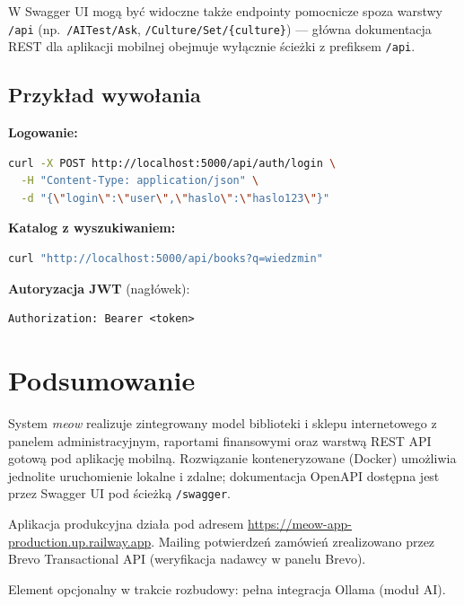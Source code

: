 \documentclass[12pt,a4paper]{article}
\begin{document}
W Swagger UI mogą być widoczne także endpointy pomocnicze spoza warstwy \texttt{/api}
(np.\ \texttt{/AITest/Ask}, \texttt{/Culture/Set/\{culture\}}) --- główna dokumentacja
REST dla aplikacji mobilnej obejmuje wyłącznie ścieżki z prefiksem \texttt{/api}.

\subsection{Przykład wywołania}

\textbf{Logowanie:}
\begin{lstlisting}[language=bash]
curl -X POST http://localhost:5000/api/auth/login \
  -H "Content-Type: application/json" \
  -d "{\"login\":\"user\",\"haslo\":\"haslo123\"}"
\end{lstlisting}

\textbf{Katalog z wyszukiwaniem:}
\begin{lstlisting}[language=bash]
curl "http://localhost:5000/api/books?q=wiedzmin"
\end{lstlisting}

\textbf{Autoryzacja JWT} (nagłówek):
\begin{lstlisting}
Authorization: Bearer <token>
\end{lstlisting}

\section{Podsumowanie}

System \textit{meow} realizuje zintegrowany model biblioteki i sklepu internetowego
z panelem administracyjnym, raportami finansowymi oraz warstwą REST API gotową pod
aplikację mobilną. Rozwiązanie konteneryzowane (Docker) umożliwia jednolite uruchomienie
lokalne i zdalne; dokumentacja OpenAPI dostępna jest przez Swagger UI pod ścieżką
\texttt{/swagger}.

Aplikacja produkcyjna działa pod adresem
\url{https://meow-app-production.up.railway.app}.
Mailing potwierdzeń zamówień zrealizowano przez Brevo Transactional API
(weryfikacja nadawcy w panelu Brevo).

Element opcjonalny w trakcie rozbudowy: pełna integracja Ollama (moduł AI).
\end{document}
